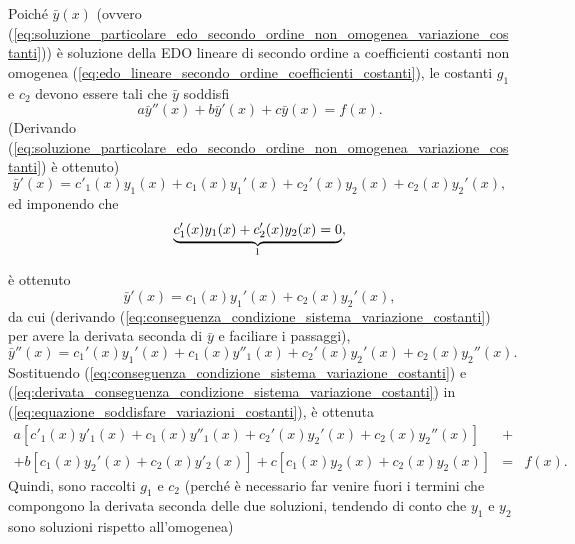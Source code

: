 \noindent Poiché $\bar y(x)$ (ovvero (\ref{eq:soluzione_particolare_edo_secondo_ordine_non_omogenea_variazione_costanti})) è soluzione della EDO lineare di secondo ordine a coefficienti costanti non omogenea (\ref{eq:edo_lineare_secondo_ordine_coefficienti_costanti}), le costanti $g_1$ e $c_2$ devono essere tali che $\bar{y}$ soddisfi
\begin{equation}\label{eq:equazione_soddisfare_variazioni_costanti}
	a\bar{y}''(x) + b\bar{y}'(x) + c\bar{y}(x) = f(x).
\end{equation}
(Derivando (\ref{eq:soluzione_particolare_edo_secondo_ordine_non_omogenea_variazione_costanti}) è ottenuto)
\begin{equation*}
	\bar{y}'(x) = c'_1(x) y_1(x) + c_1(x)y_1'(x) + c_2'(x)y_2(x) + c_2(x)y_2'(x),
\end{equation*}
ed imponendo che
\begin{equation}\label{eq:condizione_sistema_risoluzione_edo_lineare_secondo_ordine_non_omogonea_variazione}
	\underbrace{c_1'(x)y_1(x) + c_2'(x) y_2(x) = 0}_{\footnotemark},
\end{equation}
è ottenuto
\begin{equation}\label{eq:conseguenza_condizione_sistema_variazione_costanti}
	\bar{y}'(x) = c_1(x) y_1'(x) + c_2(x) y_2'(x),
\end{equation}
da cui (derivando (\ref{eq:conseguenza_condizione_sistema_variazione_costanti}) per avere la derivata seconda di $\bar{y}$ e faciliare i passaggi),
\begin{equation}\label{eq:derivata_conseguenza_condizione_sistema_variazione_costanti}
	\bar{y}''(x) = c_1'(x) y_1'(x) + c_1(x)y''_1(x) + c_2'(x) y_2'(x) + c_2(x)y_2''(x).
\end{equation}
Sostituendo (\ref{eq:conseguenza_condizione_sistema_variazione_costanti}) e (\ref{eq:derivata_conseguenza_condizione_sistema_variazione_costanti}) in (\ref{eq:equazione_soddisfare_variazioni_costanti}), è ottenuta
\begin{equation}\label{eq:punto_inizio_trucco}
	\begin{matrix}
		a[c'_1(x)y'_1(x) + c_1(x) y''_1(x) + c_2'(x) y_2'(x) + c_2(x) y_2''(x)] &+&\\
		+ b[c_1(x) y_2'(x) + c_2(x)y'_2(x)] + c[c_1(x)y_2(x) + c_2(x)y_2(x)] &=& f(x).
	\end{matrix}
\end{equation}
Quindi, sono raccolti $g_1$ e $c_2$ (perché è necessario far venire fuori i termini che compongono la derivata seconda delle due soluzioni, tendendo di conto che $y_1$ e $y_2$ sono soluzioni rispetto all'omogenea)

